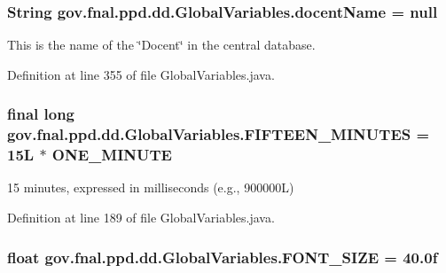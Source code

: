 \hypertarget{classgov_1_1fnal_1_1ppd_1_1dd_1_1GlobalVariables_a1a8699e7b2ec1e9cad652869fedafa2b}{
\subsubsection[{docent\-Name}]{\setlength{\rightskip}{0pt plus 5cm}String gov.\-fnal.\-ppd.\-dd.\-Global\-Variables.\-docent\-Name = null\hspace{0.3cm}{\ttfamily [static]}}}\label{classgov_1_1fnal_1_1ppd_1_1dd_1_1GlobalVariables_a1a8699e7b2ec1e9cad652869fedafa2b}
This is the name of the \char`\"{}\-Docent\char`\"{} in the central database. 

Definition at line 355 of file Global\-Variables.\-java.

\hypertarget{classgov_1_1fnal_1_1ppd_1_1dd_1_1GlobalVariables_ae09d2d42603daf3b4d5fccd1c489a93b}{
\subsubsection[{F\-I\-F\-T\-E\-E\-N\-\_\-\-M\-I\-N\-U\-T\-E\-S}]{\setlength{\rightskip}{0pt plus 5cm}final long gov.\-fnal.\-ppd.\-dd.\-Global\-Variables.\-F\-I\-F\-T\-E\-E\-N\-\_\-\-M\-I\-N\-U\-T\-E\-S = 15\-L $\ast$ O\-N\-E\-\_\-\-M\-I\-N\-U\-T\-E\hspace{0.3cm}{\ttfamily [static]}}}\label{classgov_1_1fnal_1_1ppd_1_1dd_1_1GlobalVariables_ae09d2d42603daf3b4d5fccd1c489a93b}
15 minutes, expressed in milliseconds (e.\-g., 900000\-L) 

Definition at line 189 of file Global\-Variables.\-java.

\hypertarget{classgov_1_1fnal_1_1ppd_1_1dd_1_1GlobalVariables_a9331af89f789ea1b54581c0198f7a43d}{
\subsubsection[{F\-O\-N\-T\-\_\-\-S\-I\-Z\-E}]{\setlength{\rightskip}{0pt plus 5cm}float gov.\-fnal.\-ppd.\-dd.\-Global\-Variables.\-F\-O\-N\-T\-\_\-\-S\-I\-Z\-E = 40.\-0f\hspace{0.3cm}{\ttfamily [static]}}}\label{classgov_1_1fnal_1_1ppd_1_1dd_1_1GlobalVariables_a9331af89f789ea1b54581c0198f7a43d}


